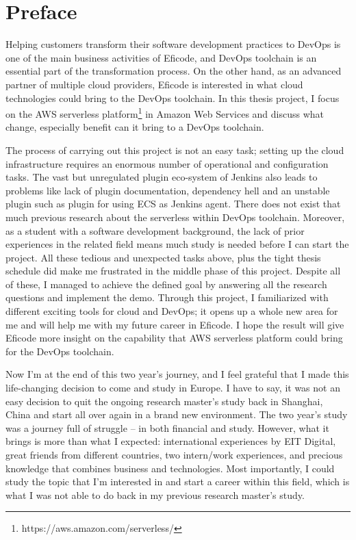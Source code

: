 \chapter*{Preface}
Helping customers transform their software development practices to DevOps is one of the main business activities of Eficode, and DevOps toolchain is an essential part of the transformation process.
On the other hand, as an advanced partner of multiple cloud providers, Eficode is interested in what cloud technologies could bring to the DevOps toolchain. In this thesis project, I focus on the AWS serverless platform\footnote{https://aws.amazon.com/serverless/} in Amazon Web Services and discuss what change, especially benefit can it bring to a DevOps toolchain.

The process of carrying out this project is not an easy task; setting up the cloud infrastructure requires an enormous number of operational and configuration tasks. The vast but unregulated plugin eco-system of Jenkins also leads to problems like lack of plugin documentation, dependency hell and an unstable plugin such as plugin for using ECS as Jenkins agent. There does not exist that much previous research about the serverless within DevOps toolchain. Moreover, as a student with a software development background, the lack of prior experiences in the related field means much study is needed before I can start the project. All these tedious and unexpected tasks above, plus the tight thesis schedule did make me frustrated in the middle phase of this project. Despite all of these, I managed to achieve the defined goal by answering all the research questions and implement the demo. Through this project, I familiarized with different exciting tools for cloud and DevOps; it opens up a whole new area for me and will help me with my future career in Eficode. I hope the result will give Eficode more insight on the capability that AWS serverless platform could bring for the DevOps toolchain.
\vspace{1\baselineskip}

\noindent
Now I'm at the end of this two year's journey, and I feel grateful that I made this life-changing decision to come and study in Europe. I have to say, it was not an easy decision to quit the ongoing research master's study back in Shanghai, China and start all over again in a brand new environment. The two year's study was a journey full of struggle -- in both financial and study. However, what it brings is more than what I expected: international experiences by EIT Digital, great friends from different countries, two intern/work experiences, and precious knowledge that combines business and technologies. Most importantly, I could study the topic that I'm interested in and start a career within this field, which is what I was not able to do back in my previous research master's study.


